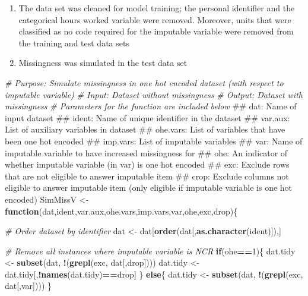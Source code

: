 \documentclass[]{book}
\newenvironment{Shaded}{\begin{snugshade}}{\end{snugshade}}
\newcommand{\KeywordTok}[1]{\textcolor[rgb]{0.13,0.29,0.53}{\textbf{#1}}}
\newcommand{\DecValTok}[1]{\textcolor[rgb]{0.00,0.00,0.81}{#1}}
\newcommand{\StringTok}[1]{\textcolor[rgb]{0.31,0.60,0.02}{#1}}
\newcommand{\CommentTok}[1]{\textcolor[rgb]{0.56,0.35,0.01}{\textit{#1}}}
\newcommand{\ControlFlowTok}[1]{\textcolor[rgb]{0.13,0.29,0.53}{\textbf{#1}}}
\newcommand{\OperatorTok}[1]{\textcolor[rgb]{0.81,0.36,0.00}{\textbf{#1}}}
\newcommand{\NormalTok}[1]{#1}
\begin{document}
\begin{enumerate}
\def\labelenumi{\arabic{enumi})}
\setcounter{enumi}{3}
\item
  The data set was cleaned for model training; the personal identifier
  and the categorical hours worked variable were removed. Moreover,
  units that were classified as no code required for the imputable
  variable were removed from the training and test data sets
\item
  Missingness was simulated in the test data set
\end{enumerate}

\begin{Shaded}
\begin{Highlighting}[]
\CommentTok{# Purpose: Simulate missingness in one hot encoded dataset (with respect to imputable variable)}
\CommentTok{# Input: Dataset without missingness}
\CommentTok{# Output: Dataset with missingness}
\CommentTok{# Parameters for the function are included below}
\NormalTok{## dat: Name of input dataset}
\NormalTok{## ident: Name of unique identifier in the dataset}
\NormalTok{## var.aux: List of auxiliary variables in dataset}
\NormalTok{## ohe.vars: List of variables that have been one hot encoded}
\NormalTok{## imp.vars: List of imputable variables}
\NormalTok{## var: Name of imputable variable to have increased missingness for}
\NormalTok{## ohe: An indicator of whether imputable variable (in var) is one hot encoded}
\NormalTok{## exc: Exclude rows that are not eligible to answer imputable item}
\NormalTok{## crop: Exclude columns not eligible to answer imputable item (only eligible if imputable variable is one hot encoded)}
\NormalTok{SimMissV <-}\StringTok{ }\ControlFlowTok{function}\NormalTok{(dat,ident,var.aux,ohe.vars,imp.vars,var,ohe,exc,drop)\{}
  
  \CommentTok{# Order dataset by identifier}
\NormalTok{  dat <-}\StringTok{ }\NormalTok{dat[}\KeywordTok{order}\NormalTok{(dat[,}\KeywordTok{as.character}\NormalTok{(ident)]),]}
  
  \CommentTok{# Remove all instances where imputable variable is NCR}
  \ControlFlowTok{if}\NormalTok{(ohe}\OperatorTok{==}\DecValTok{1}\NormalTok{)\{}
\NormalTok{    dat.tidy <-}\StringTok{ }\KeywordTok{subset}\NormalTok{(dat, }\OperatorTok{!}\NormalTok{(}\KeywordTok{grepl}\NormalTok{(exc, dat[,drop])))}
\NormalTok{    dat.tidy <-}\StringTok{ }\NormalTok{dat.tidy[,}\OperatorTok{!}\KeywordTok{names}\NormalTok{(dat.tidy)}\OperatorTok{==}\NormalTok{drop]}
\NormalTok{  \} }\ControlFlowTok{else}\NormalTok{\{}
\NormalTok{    dat.tidy <-}\StringTok{ }\KeywordTok{subset}\NormalTok{(dat, }\OperatorTok{!}\NormalTok{(}\KeywordTok{grepl}\NormalTok{(exc, dat[,var])))}
\NormalTok{  \}}
  

\end{Highlighting}
\end{Shaded}
\end{document}
